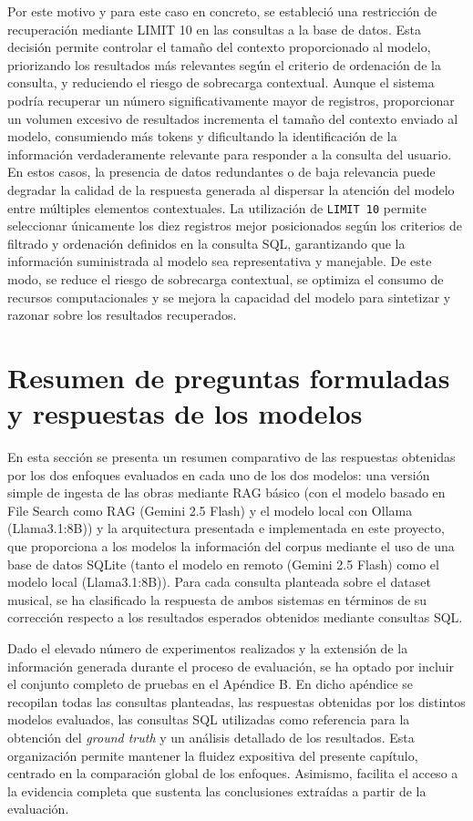Por este motivo y para este caso en concreto, se estableció una restricción de recuperación mediante LIMIT 10 en las consultas a la base de datos. Esta decisión permite controlar el tamaño del contexto proporcionado al modelo, priorizando los resultados más relevantes según el criterio de ordenación de la consulta, y reduciendo el riesgo de sobrecarga contextual. Aunque el sistema podría recuperar un número significativamente mayor de registros, proporcionar un volumen excesivo de resultados incrementa el tamaño del contexto enviado al modelo, consumiendo más tokens y dificultando la identificación de la información verdaderamente relevante para responder a la consulta del usuario. En estos casos, la presencia de datos redundantes o de baja relevancia puede degradar la calidad de la respuesta generada al dispersar la atención del modelo entre múltiples elementos contextuales. La utilización de \texttt{LIMIT 10} permite seleccionar únicamente los diez registros mejor posicionados según los criterios de filtrado y ordenación definidos en la consulta SQL, garantizando que la información suministrada al modelo sea representativa y manejable. De este modo, se reduce el riesgo de sobrecarga contextual, se optimiza el consumo de recursos computacionales y se mejora la capacidad del modelo para sintetizar y razonar sobre los resultados recuperados.

\section{Resumen de preguntas formuladas y respuestas de los modelos}
En esta sección se presenta un resumen comparativo de las respuestas obtenidas por los dos enfoques evaluados en cada uno de los dos modelos: una versión simple de ingesta de las obras mediante RAG básico (con el modelo basado en File Search como RAG (Gemini 2.5 Flash) y el modelo local con Ollama (Llama3.1:8B)) y la arquitectura presentada e implementada en este proyecto, que proporciona a los modelos la información del corpus mediante el uso de una base de datos SQLite (tanto el modelo en remoto (Gemini 2.5 Flash) como el modelo local (Llama3.1:8B)). Para cada consulta planteada sobre el dataset musical, se ha clasificado la respuesta de ambos sistemas en términos de su corrección respecto a los resultados esperados obtenidos mediante consultas SQL.

Dado el elevado número de experimentos realizados y la extensión de la información generada durante el proceso de evaluación, se ha optado por incluir el conjunto completo de pruebas en el Apéndice B. En dicho apéndice se recopilan todas las consultas planteadas, las respuestas obtenidas por los distintos modelos evaluados, las consultas SQL utilizadas como referencia para la obtención del \textit{ground truth} y un análisis detallado de los resultados. Esta organización permite mantener la fluidez expositiva del presente capítulo, centrado en la comparación global de los enfoques. Asimismo, facilita el acceso a la evidencia completa que sustenta las conclusiones extraídas a partir de la evaluación.

